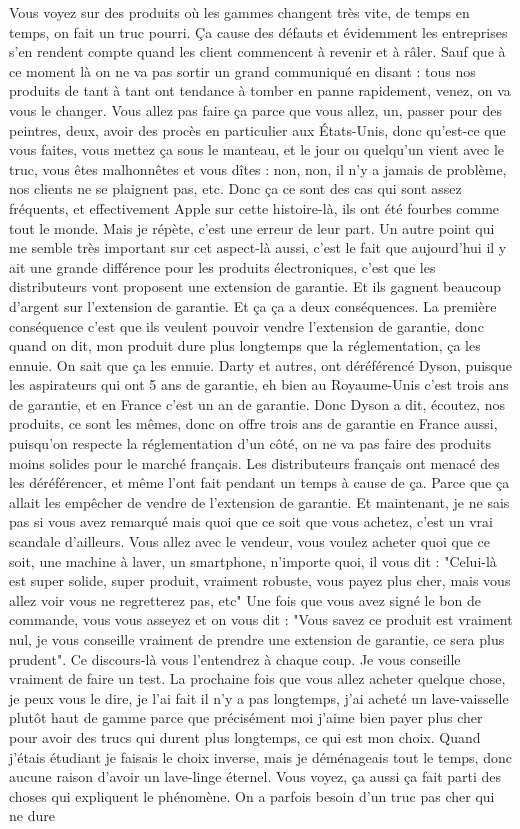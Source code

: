 \begin{small}
Vous voyez sur des produits où les gammes changent très vite, de temps en temps, on fait un truc pourri. Ça cause des défauts et évidemment les entreprises s'en rendent compte quand les client commencent à revenir et à râler. Sauf que à ce moment là on ne va pas sortir un grand communiqué en disant : tous nos produits de tant à tant ont tendance à tomber en panne rapidement, venez, on va vous le changer. Vous allez pas faire ça parce que vous allez, un, passer pour des peintres, deux, avoir des procès en particulier aux États-Unis, donc qu'est-ce que vous faites, vous mettez ça sous le manteau, et le jour ou quelqu'un vient avec le truc, vous êtes malhonnêtes et vous dîtes : non, non, il n'y a jamais de problème, nos clients ne se plaignent pas, etc. Donc ça ce sont des cas qui sont assez fréquents, et effectivement Apple sur cette histoire-là, ils ont été fourbes comme tout le monde. Mais je répète, c'est une erreur de leur part. Un autre point qui me semble très important sur cet aspect-là aussi, c'est le fait que aujourd'hui il y ait une grande différence pour les produits électroniques, c'est que les distributeurs vont proposent une extension de garantie. Et ils gagnent beaucoup d'argent sur l'extension de garantie. Et ça ça a deux conséquences. La première conséquence c'est que ils veulent pouvoir vendre l'extension de garantie, donc quand on dit, mon produit dure plus longtemps que la réglementation, ça les ennuie. On sait que ça les ennuie. Darty et autres, ont déréférencé Dyson, puisque les aspirateurs qui ont 5 ans de garantie, eh bien au Royaume-Unis c'est trois ans de garantie, et en France c'est un an de garantie. Donc Dyson a dit, écoutez, nos produits, ce sont les mêmes, donc on offre trois ans de garantie en France aussi, puisqu'on respecte la réglementation d'un côté, on ne va pas faire des produits moins solides pour le marché français. Les distributeurs français ont menacé des les déréférencer, et même l'ont fait pendant un temps à cause de ça. Parce que ça allait les empêcher de vendre de l'extension de garantie. Et maintenant, je ne sais pas si vous avez remarqué mais quoi que ce soit que vous achetez, c'est un vrai scandale d'ailleurs. Vous allez avec le vendeur, vous voulez acheter quoi que ce soit, une machine à laver, un smartphone, n'importe quoi, il vous dit : "Celui-là est super solide, super produit, vraiment robuste, vous payez plus cher, mais vous allez voir vous ne regretterez pas, etc" Une fois que vous avez signé le bon de commande, vous vous asseyez et on vous dit : "Vous savez ce produit est vraiment nul, je vous conseille vraiment de prendre une extension de garantie, ce sera plus prudent". Ce discours-là vous l'entendrez à chaque coup. Je vous conseille vraiment de faire un test. La prochaine fois que vous allez acheter quelque chose, je peux vous le dire, je l'ai fait il n'y a pas longtemps, j'ai acheté un lave-vaisselle plutôt haut de gamme parce que précisément moi j'aime bien payer plus cher pour avoir des trucs qui durent plus longtemps, ce qui est mon choix. Quand j'étais étudiant je faisais le choix inverse, mais je déménageais tout le temps, donc aucune raison d'avoir un lave-linge éternel. Vous voyez, ça aussi ça fait parti des choses qui expliquent le phénomène. On a parfois besoin d'un truc pas cher qui ne dure 
\end{small}
